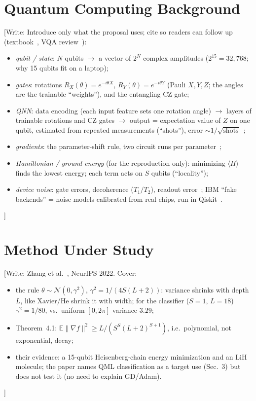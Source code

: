 \documentclass[lettersize,journal]{IEEEtran}
\newcommand{\todo}[1]{{\color{red}[Write: #1]}}
\begin{document}
\section{Quantum Computing Background}
\todo{Introduce only what the proposal uses; cite so readers can follow up (textbook~\cite{nielsen2010quantum}, VQA review~\cite{cerezo2021vqa}):
\begin{itemize}
\item \emph{qubit / state}: $N$ qubits $\to$ a vector of $2^N$ complex amplitudes ($2^{15}=32{,}768$; why 15 qubits fit on a laptop);
\item \emph{gates}: rotations $R_X(\theta)=e^{-i\theta X}$, $R_Y(\theta)=e^{-i\theta Y}$ (Pauli $X,Y,Z$; the angles are the trainable ``weights''), and the entangling CZ gate;
\item \emph{QNN}: data encoding (each input feature sets one rotation angle) $\to$ layers of trainable rotations and CZ gates $\to$ output = expectation value of $Z$ on one qubit, estimated from repeated measurements (``shots''), error $\sim1/\sqrt{\text{shots}}$~\cite{nielsen2010quantum,cerezo2021vqa};
\item \emph{gradients}: the parameter-shift rule, two circuit runs per parameter~\cite{schuld2019gradients};
\item \emph{Hamiltonian / ground energy} (for the reproduction only): minimizing $\langle H\rangle$ finds the lowest energy; each term acts on $S$ qubits (``locality'');
\item \emph{device noise}: gate errors, decoherence ($T_1/T_2$), readout error~\cite{nielsen2010quantum}; IBM ``fake backends'' = noise models calibrated from real chips, run in Qiskit~\cite{javadiabhari2024qiskit}.
\end{itemize}}

\section{Method Under Study}
\todo{Zhang et al.~\cite{zhang2022escaping}, NeurIPS 2022. Cover:
\begin{itemize}
\item the rule $\theta\sim\mathcal{N}(0,\gamma^2)$, $\gamma^2 = 1/(4S(L+2))$: variance shrinks with depth $L$, like Xavier/He shrink it with width; for the classifier ($S=1$, $L=18$) $\gamma^2=1/80$, vs.\ uniform $[0,2\pi]$ variance $3.29$;
\item Theorem~4.1: $\mathbb{E}\|\nabla f\|^2 \ge L/(S^S(L+2)^{S+1})$, i.e.\ polynomial, not exponential, decay;
\item their evidence: a 15-qubit Heisenberg-chain energy minimization and an LiH molecule; the paper names QML classification as a target use (Sec.~3) but does not test it (no need to explain GD/Adam).
\end{itemize}}
\end{document}
